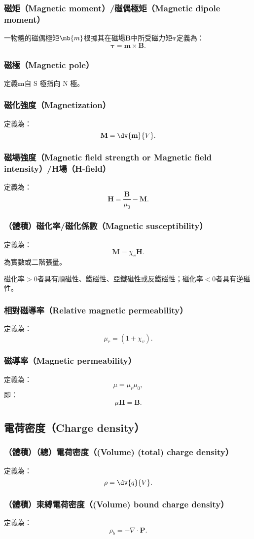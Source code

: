 \documentclass[a4paper,12pt]{report}
\begin{document}
\begin{itemize}
\subsubsection{磁矩（Magnetic moment）/磁偶極矩（Magnetic dipole moment）}
一物體的磁偶極矩$\mb{m}$根據其在磁場$\mathbf{B}$中所受磁力矩$\boldsymbol{\tau}$定義為：
\[\boldsymbol{\tau} = \mathbf{m} \times \mathbf{B}.\]
\subsubsection{磁極（Magnetic pole）}
定義$\mathbf{m}$自 S 極指向 N 極。
\subsubsection{磁化強度（Magnetization）}
定義為：
\[\mathbf{M} = \dv{\mathbf{m}}{V}.\]
\subsubsection{磁場強度（Magnetic field strength or Magnetic field intensity）/H場（H-field）}
定義為：
\[\mathbf{H} = \frac{\mathbf{B}}{\mu_0} - \mathbf{M}.\]
\subsubsection{（體積）磁化率/磁化係數（Magnetic susceptibility）}
定義為：
\[\mathbf{M}=\chi_v\mathbf{H}.\]
為實數或二階張量。

磁化率$>0$者具有順磁性、鐵磁性、亞鐵磁性或反鐵磁性；磁化率$<0$者具有逆磁性。
\subsubsection{相對磁導率（Relative magnetic permeability）}
定義為：
\[\mu_r=(1+\chi_v).\]
\subsubsection{磁導率（Magnetic permeability）}
定義為：
\[\mu=\mu_r\mu_0,\]
即：
\[\mu\mathbf{H}=\mathbf{B}.\]
\subsection{電荷密度（Charge density）}
\subsubsection{（體積）（總）電荷密度（(Volume) (total) charge density）}
定義為：
\[\rho = \dv{q}{V}.\]
\subsubsection{（體積）束縛電荷密度（(Volume) bound charge density）}
定義為：
\[\rho_b = -\nabla \cdot \mathbf{P}.\]

\end{itemize}
\end{document}
